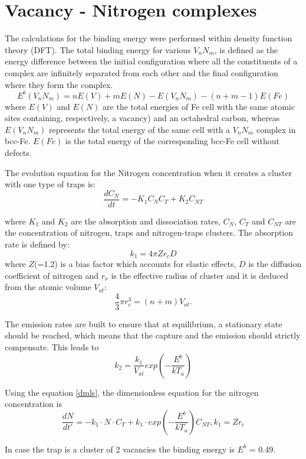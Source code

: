 \documentclass[12pt,a4paper]{article}
\begin{document}
\section{Vacancy - Nitrogen complexes}

The calculations for the binding energy were performed within density function theory (DFT). The total binding energy for various $V_nN_m$, is defined as the energy difference between the initial configuration where all the constituents of a complex are infinitely separated from each other and the final configuration where they form the complex.
\begin{equation}
	E^b (V_nN_m) = nE(V) + mE(N) - E(V_nN_m) - (n+m-1)E(Fe)
\end{equation}
where $E(V)$ and $E(N)$ are the total energies of Fe cell with the same atomic sites containing, respectively, a vacancy) and an octahedral carbon, whereas $E(V_nN_m)$ represents the total energy of the same cell with a $V_nN_m$ complex in bcc-Fe. $E(Fe)$ is the total energy of the corresponding bcc-Fe cell without defects.

The evolution equation for the Nitrogen concentration when it creates a cluster with one type of traps is:
\begin{equation}
	\frac{dC_N}{dt} = -K_1 C_N C_T + K_2 C_{NT} 
\end{equation}

where $K_1$ and $K_2$ are the absorption and dissociation rates, $C_N$, $C_T$ and $C_{NT}$ are the concentration of nitrogen, traps and nitrogen-traps clusters. The absorption rate is defined by:
\begin{equation}
	k_1 = 4\pi Z r_c D
\end{equation}
where $Z$(=1.2) is a bias factor which accounts for elastic effects, $D$ is the diffusion coefficient of nitrogen and $r_\nu$ is the effective radius of cluster and it is deduced from the atomic volume $V_{at}$:
\begin{equation}
	\frac{4}{3}\pi r^3_c = (n+m) V_{at}.
\end{equation}

The emission rates are built to ensure that at equilibrium, a stationary state should be reached, which means that the capture and the emission should strictly compensate. This leads to
\begin{equation}
	k_2 = \frac{k_1}{V_{at}}exp(-\frac{E^b}{kT_a})
\end{equation}

Using the equation \ref{dmls}, the dimensionless equation for the nitrogen concentration is
\begin{equation}
	\frac{dN}{dt'} = - k_1 \cdot N \cdot C_T + k_1 \cdot exp(-\frac{E^b}{kT_a}) C_{NT}, k_1 = Zr_c
\end{equation} 

In case the trap is a cluster of 2 vacancies the binding energy is $E^b$ = 0.49.
 


\end{document}
